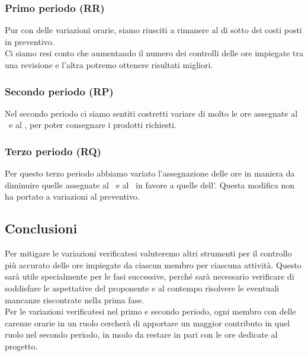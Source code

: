     	\subsubsection{Primo periodo (RR)}
   		Pur con delle variazioni orarie, siamo riusciti a rimanere al di sotto dei costi posti in preventivo.\\
   		Ci siamo resi conto che aumentando il numero dei controlli delle ore impiegate tra una revisione e l'altra potremo ottenere risultati migliori.
	
    	\subsubsection{Secondo periodo (RP)}
    	Nel secondo periodo ci siamo sentiti costretti variare di molto le ore assegnate al \Progr\ e al \Prog, per poter consegnare i prodotti richiesti.
    	
    	\subsubsection{Terzo periodo (RQ)}
    	Per questo terzo periodo abbiamo variato l'assegnazione delle ore in maniera da diminuire quelle assegnate al \Progr\ e al \Ver\ in favore a quelle dell'\Ana. 
    	Questa modifica non ha portato a variazioni al preventivo.
    	
	\subsection{Conclusioni}
	Per mitigare le variazioni verificatesi valuteremo altri strumenti per il controllo più accurato delle ore impiegate da ciascun membro per ciascuna attività.
	Questo sarà utile specialmente per le fasi successive, perché sarà necessario verificare di soddisfare le aspettative del proponente e al contempo risolvere le eventuali mancanze riscontrate nella prima fase.\\
	Per le variazioni verificatesi nel primo e secondo periodo, ogni membro con delle carenze orarie in un ruolo cercherà di apportare un maggior contributo in quel ruolo nel secondo periodo, in modo da restare in pari con le ore dedicate al progetto.
	